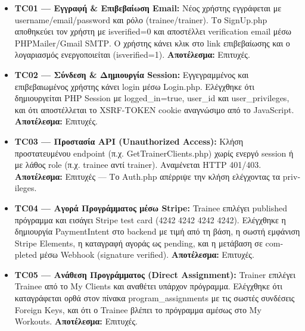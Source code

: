 \documentclass[12pt,a4paper]{report}
\begin{document}
\begin{itemize}
    \item \textbf{TC01 --- Εγγραφή \& Επιβεβαίωση Email:} Νέος χρήστης εγγράφεται με \textenglish{username/email/password} και ρόλο (\textenglish{trainee/trainer}). Το \textenglish{SignUp.php} αποθηκεύει τον χρήστη με \textenglish{isverified=0} και αποστέλλει \textenglish{verification email} μέσω \textenglish{PHPMailer/Gmail SMTP}. Ο χρήστης κάνει κλικ στο \textenglish{link} επιβεβαίωσης και ο λογαριασμός ενεργοποιείται (\textenglish{isverified=1}). \textbf{Αποτέλεσμα:} Επιτυχές.

    \item \textbf{TC02 --- Σύνδεση \& Δημιουργία Session:} Εγγεγραμμένος και επιβεβαιωμένος χρήστης κάνει \textenglish{login} μέσω \textenglish{Login.php}. Ελέγχθηκε ότι δημιουργείται \textenglish{PHP Session} με \textenglish{logged\_in=true}, \textenglish{user\_id} και \textenglish{user\_privileges}, και ότι αποστέλλεται το \textenglish{XSRF-TOKEN cookie} αναγνώσιμο από το \textenglish{JavaScript}. \textbf{Αποτέλεσμα:} Επιτυχές.

    \item \textbf{TC03 --- Προστασία API (Unauthorized Access):} Κλήση προστατευμένου \textenglish{endpoint} (π.χ. \textenglish{GetTrainerClients.php}) χωρίς ενεργό \textenglish{session} ή με λάθος \textenglish{role} (π.χ. \textenglish{trainee} αντί \textenglish{trainer}). Αναμένεται \textenglish{HTTP 401/403}. \textbf{Αποτέλεσμα:} Επιτυχές --- Το \textenglish{Auth.php} απέρριψε την κλήση ελέγχοντας τα \textenglish{privileges}.

    \item \textbf{TC04 --- Αγορά Προγράμματος μέσω Stripe:} \textenglish{Trainee} επιλέγει \textenglish{published} πρόγραμμα και εισάγει \textenglish{Stripe test card (4242 4242 4242 4242)}. Ελέγχθηκε η δημιουργία \textenglish{PaymentIntent} στο \textenglish{backend} με τιμή από τη βάση, η σωστή εμφάνιση \textenglish{Stripe Elements}, η καταγραφή αγοράς ως \textenglish{pending}, και η μετάβαση σε \textenglish{completed} μέσω \textenglish{Webhook (signature verified)}. \textbf{Αποτέλεσμα:} Επιτυχές.

    \item \textbf{TC05 --- Ανάθεση Προγράμματος (Direct Assignment):} \textenglish{Trainer} επιλέγει \textenglish{Trainee} από το \textenglish{My Clients} και αναθέτει υπάρχον πρόγραμμα. Ελέγχθηκε ότι καταγράφεται ορθά στον πίνακα \textenglish{program\_assignments} με τις σωστές συνδέσεις \textenglish{Foreign Keys}, και ότι ο \textenglish{Trainee} βλέπει το πρόγραμμα αμέσως στο \textenglish{My Workouts}. \textbf{Αποτέλεσμα:} Επιτυχές.


\end{itemize}
\end{document}

